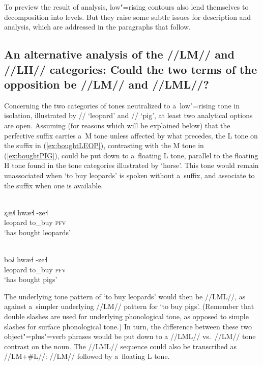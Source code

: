 To preview the result of analysis, low"=rising contours also lend themselves to decomposition into levels. But they raise some subtle issues for description and
analysis, which are addressed in the paragraphs that follow.


\subsection[An alternative analysis of \mbox{//LM//} and \mbox{//LH//}]{An alternative analysis of the \mbox{//LM//} and \mbox{//LH//} categories: Could the two terms of the opposition be \mbox{//LM//} and \mbox{//LML//}?}
\label{sec:twooptionsforanalysislmvslhorlmvslml}

Concerning the two categories of tones neutralized to a~low"=rising tone in isolation, illustrated by
// ‘leopard’ and // ‘pig’, at least two analytical options are open. Assuming (for reasons which
will be explained below) that the perfective suffix carries a~M tone unless affected by what
precedes, the L tone on the suffix in (\ref{ex:boughtLEOP}), contrasting with the M tone in (\ref{ex:boughtPIG}), could be put down to
a~floating L tone, parallel to the floating H tone found in the tone categories illustrated by
‘horse’. This tone would remain unassociated when ‘to buy leopards’ is spoken without a~suffix, and associate to the suffix when one is available. 

\begin{exe}
	\ex
	\\
	\label{ex:boughtLEOP}
	\gll ʐæ˩˥	hwæ˧	-ze˧\\
	leopard		to\_buy		\textsc{pfv}\\
	\glt ‘has bought leopards’
\end{exe}

\Hack{\newpage}

\begin{exe}
	\ex
	\\
	\label{ex:boughtPIG}
	\gll bo˩˧	hwæ˧	-ze˧\\
	leopard		to\_buy		\textsc{pfv}\\
	\glt ‘has bought pigs’
\end{exe}

The underlying tone pattern of ‘to buy leopards’
would then be \mbox{//LML//}, as against a~simpler underlying \mbox{//LM//} pattern for ‘to buy pigs’. (Remember that double slashes are used for underlying phonological tone, as opposed to simple slashes for surface phonological tone.) In turn, the difference
between these two object"=plus"=verb phrases would be put down to a \mbox{//LML//} vs.\ \mbox{//LM//} tone contrast on the
noun. The \mbox{//LML//} sequence could also be transcribed as //LM+\#L//: \mbox{//LM//} followed by a~floating L tone.

